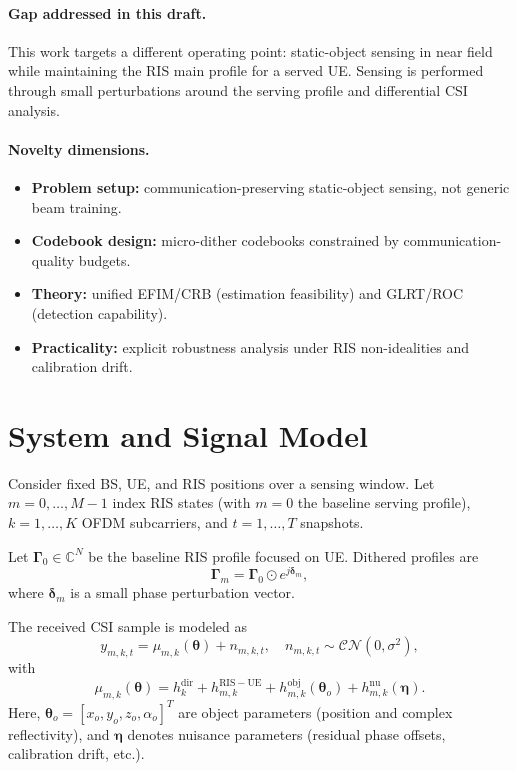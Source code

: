 \documentclass[11pt,a4paper]{article}
\newcommand{\C}{\mathbb{C}}
\begin{document}
\paragraph{Gap addressed in this draft.}
This work targets a different operating point: static-object sensing in near field while maintaining the RIS main profile for a served UE. Sensing is performed through small perturbations around the serving profile and differential CSI analysis.

\paragraph{Novelty dimensions.}
\begin{itemize}
\item \textbf{Problem setup:} communication-preserving static-object sensing, not generic beam training.
\item \textbf{Codebook design:} micro-dither codebooks constrained by communication-quality budgets.
\item \textbf{Theory:} unified EFIM/CRB (estimation feasibility) and GLRT/ROC (detection capability).
\item \textbf{Practicality:} explicit robustness analysis under RIS non-idealities and calibration drift.
\end{itemize}

\section{System and Signal Model}
Consider fixed BS, UE, and RIS positions over a sensing window. Let $m=0,\ldots,M-1$ index RIS states (with $m=0$ the baseline serving profile), $k=1,\ldots,K$ OFDM subcarriers, and $t=1,\ldots,T$ snapshots.

Let $\bm{\Gamma}_0 \in \C^N$ be the baseline RIS profile focused on UE. Dithered profiles are
\begin{equation}
\bm{\Gamma}_m = \bm{\Gamma}_0 \odot e^{j\bm{\delta}_m},
\end{equation}
where $\bm{\delta}_m$ is a small phase perturbation vector.

The received CSI sample is modeled as
\begin{equation}
y_{m,k,t} = \mu_{m,k}(\bm{\theta}) + n_{m,k,t}, \quad n_{m,k,t}\sim\mathcal{CN}(0,\sigma^2),
\end{equation}
with
\begin{equation}
\mu_{m,k}(\bm{\theta}) =
h^{\mathrm{dir}}_k + h^{\mathrm{RIS-UE}}_{m,k}
+ h^{\mathrm{obj}}_{m,k}(\bm{\theta}_o) + h^{\mathrm{nu}}_{m,k}(\bm{\eta}).
\end{equation}
Here, $\bm{\theta}_o=[x_o,y_o,z_o,\alpha_o]^T$ are object parameters (position and complex reflectivity), and $\bm{\eta}$ denotes nuisance parameters (residual phase offsets, calibration drift, etc.).
\end{document}

